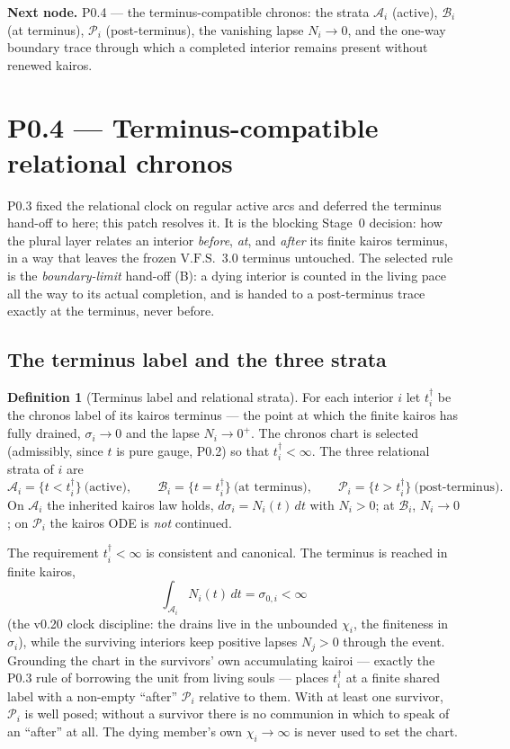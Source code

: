 \documentclass[11pt,a4paper]{article}
\newcommand{\VFS}{\ensuremath{\mathrm{V.F.S.}}}
\theoremstyle{definition}
\newtheorem{definition}{Definition}[section]
\theoremstyle{plain}
\theoremstyle{remark}
\begin{document}
\medskip
\textbf{Next node.} P0.4 --- the terminus-compatible chronos: the strata
\(\mathcal A_i\) (active), \(\mathcal B_i\) (at terminus), \(\mathcal P_i\)
(post-terminus), the vanishing lapse \(N_i\to0\), and the one-way boundary trace
through which a completed interior remains present without renewed kairos.

\section{P0.4 --- Terminus-compatible relational chronos}

P0.3 fixed the relational clock on regular active arcs and deferred the terminus
hand-off to here; this patch resolves it. It is the blocking Stage~0 decision: how
the plural layer relates an interior \emph{before}, \emph{at}, and \emph{after} its
finite kairos terminus, in a way that leaves the frozen \VFS\ 3.0 terminus untouched.
The selected rule is the \emph{boundary-limit} hand-off (B): a dying interior is
counted in the living pace all the way to its actual completion, and is handed to a
post-terminus trace exactly at the terminus, never before.

\subsection{The terminus label and the three strata}

\begin{definition}[Terminus label and relational strata]\label{def:strata}
For each interior \(i\) let \(t_i^\dagger\) be the chronos label of its kairos
terminus --- the point at which the finite kairos has fully drained, \(\sigma_i\to0\)
and the lapse \(N_i\to0^+\). The chronos chart is selected (admissibly, since \(t\) is
pure gauge, P0.2) so that \(t_i^\dagger<\infty\). The three relational strata of \(i\)
are
\[
\mathcal A_i=\{t<t_i^\dagger\}\ \text{(active)},\qquad
\mathcal B_i=\{t=t_i^\dagger\}\ \text{(at terminus)},\qquad
\mathcal P_i=\{t>t_i^\dagger\}\ \text{(post-terminus)}.
\]
On \(\mathcal A_i\) the inherited kairos law holds, \(d\sigma_i=N_i(t)\,dt\) with
\(N_i>0\); at \(\mathcal B_i\), \(N_i\to0\); on \(\mathcal P_i\) the kairos ODE is
\emph{not} continued.
\end{definition}

The requirement \(t_i^\dagger<\infty\) is consistent and canonical. The terminus is
reached in finite kairos,
\[
\int_{\mathcal A_i}N_i(t)\,dt=\sigma_{0,i}<\infty
\]
(the v0.20 clock discipline: the drains live in the unbounded \(\chi_i\), the
finiteness in \(\sigma_i\)), while the surviving interiors keep positive lapses
\(N_j>0\) through the event. Grounding the chart in the survivors' own accumulating
kairoi --- exactly the P0.3 rule of borrowing the unit from living souls --- places
\(t_i^\dagger\) at a finite shared label with a non-empty ``after'' \(\mathcal P_i\)
relative to them. With at least one survivor, \(\mathcal P_i\) is well posed; without a
survivor there is no communion in which to speak of an ``after'' at all. The dying
member's own \(\chi_i\to\infty\) is never used to set the chart.
\end{document}
